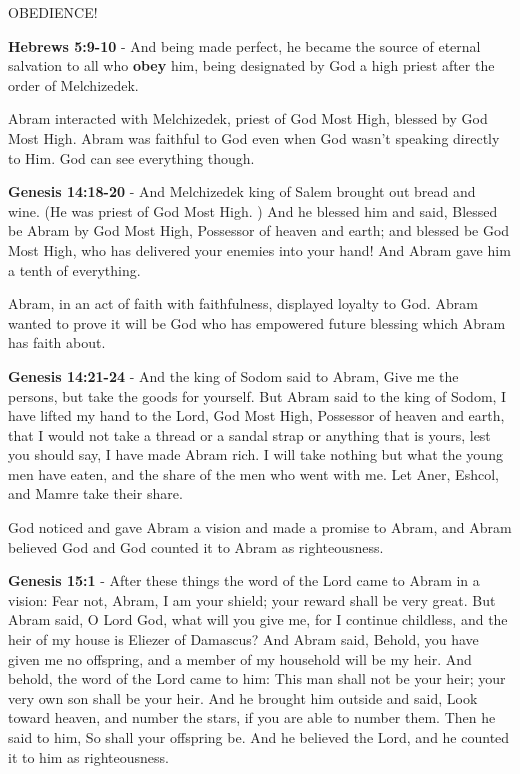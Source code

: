 \documentclass[11pt]{article}
\begin{document}
OBEDIENCE!

\textbf{Hebrews 5:9-10} - And being made perfect, he became the source of eternal salvation to all who \textbf{obey} him, being designated by God a high priest after the order of Melchizedek.

Abram interacted with Melchizedek, priest of God Most High, blessed by God Most High. Abram was faithful to God even when God wasn't speaking directly to Him. God can see everything though.

\textbf{Genesis 14:18-20} - And Melchizedek king of Salem brought out bread and wine. (He was priest of God Most High. ) And he blessed him and said, Blessed be Abram by God Most High, Possessor of heaven and earth; and blessed be God Most High, who has delivered your enemies into your hand! And Abram gave him a tenth of everything.

Abram, in an act of faith with faithfulness, displayed loyalty to God. Abram wanted to prove it will be God who has empowered future blessing which Abram has faith about.

\textbf{Genesis 14:21-24} - And the king of Sodom said to Abram, Give me the persons, but take the goods for yourself.  But Abram said to the king of Sodom, I have lifted my hand to the Lord, God Most High, Possessor of heaven and earth, that I would not take a thread or a sandal strap or anything that is yours, lest you should say, I have made Abram rich.  I will take nothing but what the young men have eaten, and the share of the men who went with me. Let Aner, Eshcol, and Mamre take their share.

God noticed and gave Abram a vision and made a promise to Abram, and Abram believed God and God counted it to Abram as righteousness.

\textbf{Genesis 15:1} - After these things the word of the Lord came to Abram in a vision: Fear not, Abram, I am your shield; your reward shall be very great.  But Abram said, O Lord God, what will you give me, for I continue childless, and the heir of my house is Eliezer of Damascus?  And Abram said, Behold, you have given me no offspring, and a member of my household will be my heir.  And behold, the word of the Lord came to him: This man shall not be your heir; your very own son shall be your heir.  And he brought him outside and said, Look toward heaven, and number the stars, if you are able to number them. Then he said to him, So shall your offspring be.  And he believed the Lord, and he counted it to him as righteousness.
\end{document}
